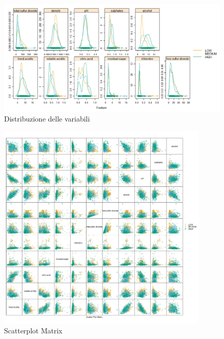     \vspace{1.2cm}
    \begin{figure}[!h]
        \includegraphics[width=\textwidth]{img/Rplot.png}
        \centering
        \caption{Distribuzione delle variabili}
        \label{fig:out_featureplot}
     \end{figure}   
         
    \newpage
    \begin{figure}[!h]
        \includegraphics[width=0.9\textwidth]{img/scatterplot_2000.png}
        \centering
        \caption{Scatterplot Matrix}
        \label{fig:out_scatterplot_matrix}
    \end{figure}
    
    \vspace{1cm}
    

